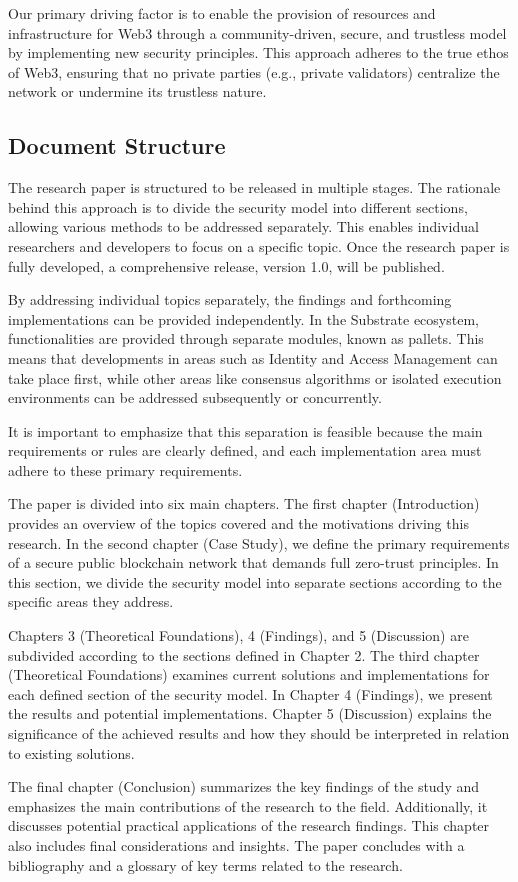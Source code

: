 Our primary driving factor is to enable the provision of resources and infrastructure for Web3 through a community-driven, secure, and trustless model by implementing new security principles. This approach adheres to the true ethos of Web3, ensuring that no private parties (e.g., private validators) centralize the network or undermine its trustless nature.   

\subsection{Document Structure}
The research paper is structured to be released in multiple stages. The rationale behind this approach is to divide the security model into different sections, allowing various methods to be addressed separately. This enables individual researchers and developers to focus on a specific topic. Once the research paper is fully developed, a comprehensive release, version 1.0, will be published.

By addressing individual topics separately, the findings and forthcoming implementations can be provided independently. In the Substrate ecosystem, functionalities are provided through separate modules, known as pallets. This means that developments in areas such as Identity and Access Management can take place first, while other areas like consensus algorithms or isolated execution environments can be addressed subsequently or concurrently.

It is important to emphasize that this separation is feasible because the main requirements or rules are clearly defined, and each implementation area must adhere to these primary requirements.

The paper is divided into six main chapters. The first chapter (Introduction) provides an overview of the topics covered and the motivations driving this research. In the second chapter (Case Study), we define the primary requirements of a secure public blockchain network that demands full zero-trust principles. In this section, we divide the security model into separate sections according to the specific areas they address.

Chapters 3 (Theoretical Foundations), 4 (Findings), and 5 (Discussion) are subdivided according to the sections defined in Chapter 2. The third chapter (Theoretical Foundations) examines current solutions and implementations for each defined section of the security model. In Chapter 4 (Findings), we present the results and potential implementations. Chapter 5 (Discussion) explains the significance of the achieved results and how they should be interpreted in relation to existing solutions.

The final chapter (Conclusion) summarizes the key findings of the study and emphasizes the main contributions of the research to the field. Additionally, it discusses potential practical applications of the research findings. This chapter also includes final considerations and insights. The paper concludes with a bibliography and a glossary of key terms related to the research.